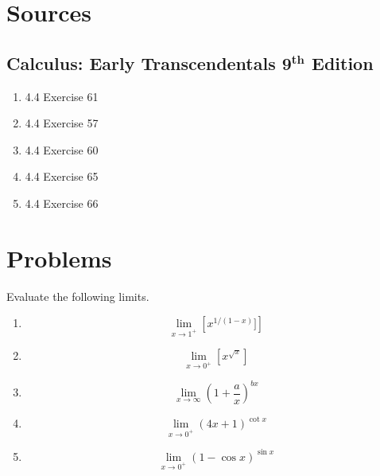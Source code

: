 \documentclass[12pt, A4]{report}
\begin{document}
		\section*{Sources}
			\subsection*{Calculus: Early Transcendentals 9$^{\textbf{th}}$ Edition}
				\begin{enumerate}
					\item
						4.4 Exercise 61
					\item
						4.4 Exercise 57
					\item
						4.4 Exercise 60
					\item
						4.4 Exercise 65
					\item
						4.4 Exercise 66
				\end{enumerate}
			\newpage
		\section*{Problems}
			Evaluate the following limits.
			\begin{enumerate}
				\item
					\[\lim_{x\to 1^+}\left[x^{1/(1 - x)}]\right]\]
				\item
					\[\lim_{x\to 0^+}\left[x^{\sqrt{x}}\right]\]
				\item
					\[\lim_{x\to\infty}\left(1 + \frac{a}{x}\right)^{bx}\]
				\item
					\[\lim_{x\to 0^+}(4x + 1)^{\cot x}\]
				\item
					\[\lim_{x\to 0^+}(1 - \cos x)^{\sin x}\]
			\end{enumerate}
			\newpage
\end{document}

